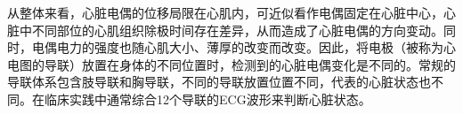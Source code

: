 从整体来看，心脏电偶的位移局限在心肌内，可近似看作电偶固定在心脏中心，心脏中不同部位的心肌组织除极时间存在差异，从而造成了心脏电偶的方向变动。同时，电偶电力的强度也随心肌大小、薄厚的改变而改变。因此，将电极（被称为心电图的导联）放置在身体的不同位置时，检测到的心脏电偶变化是不同的。常规的导联体系包含肢导联和胸导联，不同的导联放置位置不同，代表的心脏状态也不同。在临床实践中通常综合12个导联的ECG波形来判断心脏状态。

\begin{figure}[htb]
\begin{center}
\begin{minipage}[b]{0.55\linewidth}
\begin{center}
\end{center}
\end{minipage}
\end{center}
\end{figure}
